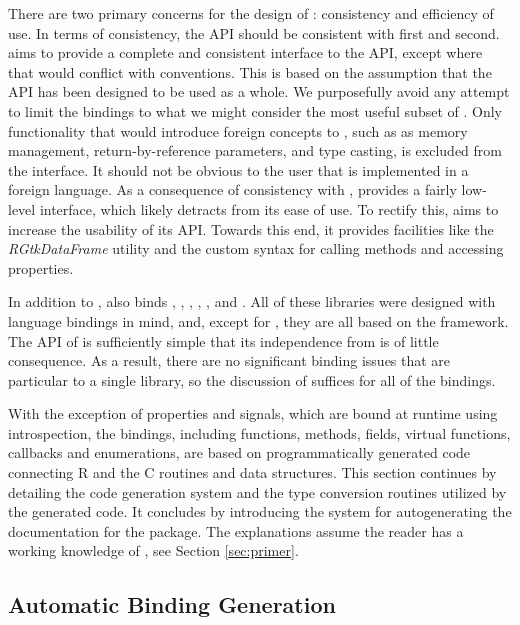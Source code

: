 \documentclass[article]{jss}
\begin{document}
There are two primary concerns for the design of :
consistency
and efficiency of use. In terms of consistency, the API should be
consistent 
with  first and  second.  aims to
provide a 
complete and consistent interface to the  API, except where
that would
conflict with  conventions. This is based on the
assumption that the
 API has been designed to be used as a whole. We
purposefully avoid 
any attempt to limit the bindings to what we might consider the most
useful 
subset of . Only functionality that would introduce foreign
concepts
to , such as as memory management, return-by-reference
parameters, 
and type casting, is excluded from the  interface. It
should not be
obvious to the user that  is implemented in a foreign
language.
As a consequence of consistency with ,  provides
a fairly 
low-level interface, which likely detracts from its ease of use. To
rectify
this,  aims to increase the usability of its API. 
Towards this end, it provides facilities like the \emph{RGtkDataFrame}
utility 
and the custom syntax for calling methods and accessing properties. 

In addition to ,  also binds
, , , , , and
.
All of these libraries were designed with language bindings in mind,
and, except
for , they are all based on the  framework.
The API of
 is sufficiently simple that its independence from
 is
of little consequence. As a result, there are no significant binding
issues that
are particular to a single library, so the discussion of 
suffices
for all of the bindings. 

With the exception of properties and signals, which are bound at
runtime using introspection, the  bindings, including
functions, methods, fields, virtual functions, callbacks and
enumerations, are based on programmatically generated code connecting
R and the C routines and data structures.  This section continues by
detailing the code
generation system and the type conversion routines utilized by the
generated code. It concludes by introducing the system for
autogenerating the  documentation for the package. The
explanations assume the reader has a working knowledge of
, see Section \ref{sec:primer}.

\subsection{Automatic Binding Generation}
\end{document}
